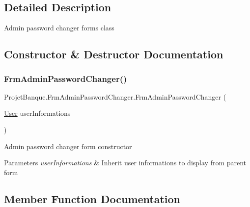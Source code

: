 \subsection{Detailed Description}
Admin password changer form\textquotesingle{}s class 



\subsection{Constructor \& Destructor Documentation}
\mbox{\label{class_projet_banque_1_1_frm_admin_password_changer_a64ece1dfd49ad952ce43521f025256bf}} 
\subsubsection{\texorpdfstring{FrmAdminPasswordChanger()}{FrmAdminPasswordChanger()}}
{\footnotesize\ttfamily Projet\+Banque.\+Frm\+Admin\+Password\+Changer.\+Frm\+Admin\+Password\+Changer (\begin{DoxyParamCaption}\item[{\mbox{\hyperlink{class_projet_banque_1_1_user}{User}}}]{user\+Informations }\end{DoxyParamCaption})}



Admin password changer form constructor 


\begin{DoxyParams}{Parameters}
{\em user\+Informations} & Inherit user informations to display from parent form\\
\hline
\end{DoxyParams}


\subsection{Member Function Documentation}
\mbox{\label{class_projet_banque_1_1_frm_admin_password_changer_aabfbbd95a43e94586d993ac2def275ea}} 
